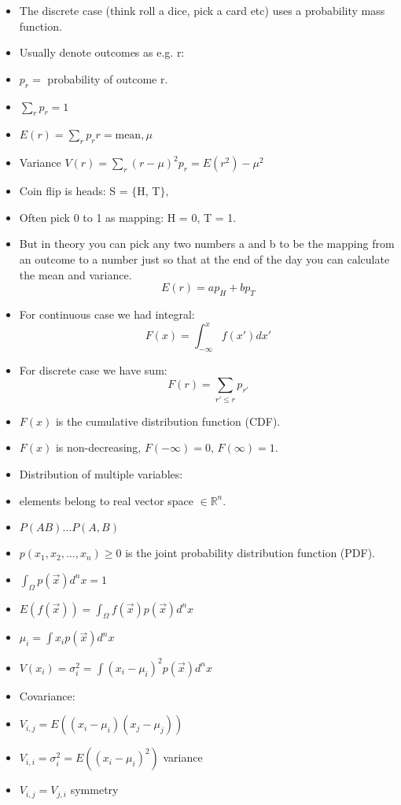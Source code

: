 \begin{itemize}
    \item The discrete case (think roll a dice, pick a card etc) uses a probability mass function.
    \item Usually denote outcomes as e.g. r:
    \item $p_r =$ probability of outcome r.
    \item $\sum_r p_r = 1$
    \item $E(r) = \sum_r p_r r = \text{mean,}\, \mu$
    \item Variance $ V(r) = \sum_r (r-\mu)^2 p_r = E(r^2) - \mu^2$
    \item Coin flip is heads: S = $\{$H, T$\}$, 
    \item Often pick 0 to 1 as mapping: H = 0, T = 1.
    \item But in theory you can pick any two numbers a and b to be the mapping from an outcome to a number just so that at the end of the day you can calculate the mean and variance.
    \[ E(r) = ap_H + bp_T \]
    \item For continuous case we had integral:
    \[ F(x) = \int_{-\infty}^{x} f(x') dx' \]
    \item For discrete case we have sum:
    \[ F(r) = \sum_{r' \leq r} p_{r'} \]
    \item $F(x)$ is the cumulative distribution function (CDF).
    \item $F(x)$ is non-decreasing, $F(-\infty) = 0$, $F(\infty) = 1$.
    \item Distribution of multiple variables:
    \item elements belong to real vector space $\in \mathbb{R}^n$.
    \item $P(AB) \dots P(A,B)$
    \item $p(x_1, x_2, \ldots, x_n) \ge 0$ is the joint probability distribution function (PDF).
    \item $\int_{\Omega} p(\vec{x}) d^n x = 1$
    \item $E(f(\vec{x})) = \int_{\Omega} f(\vec{x}) p(\vec{x}) d^n x$
    \item $\mu_i = \int x_i p(\vec{x}) d^n x$
    \item $V(x_i) = \sigma_i^2 = \int (x_i - \mu_i)^2 p(\vec{x}) d^n x$
    \item Covariance:
    \item $V_{i,j} = E((x_i-\mu_i)(x_j-\mu_j))$
    \item $V_{i,i} = \sigma_i^2 = E((x_i-\mu_i)^2)$ variance
    \item $V_{i,j} = V_{j,i}$ symmetry
\end{itemize}



